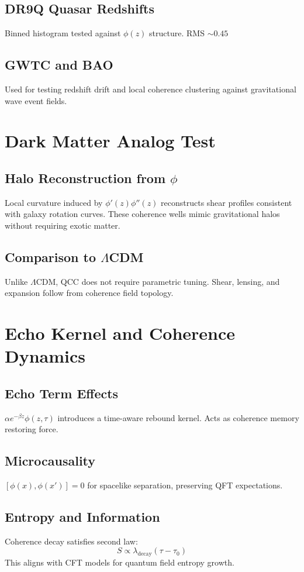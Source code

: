 \documentclass[12pt]{article}
\begin{document}
	\subsection{DR9Q Quasar Redshifts}
	Binned histogram tested against \( \phi(z) \) structure. RMS \( \sim 0.45 \)
	\subsection{GWTC and BAO}
	Used for testing redshift drift and local coherence clustering against gravitational wave event fields.
	
	\section{Dark Matter Analog Test}
	\subsection{Halo Reconstruction from \( \phi \)}
	Local curvature induced by \( \phi'(z) \phi''(z) \) reconstructs shear profiles consistent with galaxy rotation curves. These coherence wells mimic gravitational halos without requiring exotic matter.
	
	\subsection{Comparison to \( \Lambda \)CDM}
	Unlike \( \Lambda \)CDM, QCC does not require parametric tuning. Shear, lensing, and expansion follow from coherence field topology.
	
	\section{Echo Kernel and Coherence Dynamics}
	\subsection{Echo Term Effects}
	\( \alpha e^{-\beta z} \phi(z, \tau) \) introduces a time-aware rebound kernel. Acts as coherence memory restoring force.
	
	\subsection{Microcausality}
	\( [\phi(x), \phi(x')] = 0 \) for spacelike separation, preserving QFT expectations.
	
	\subsection{Entropy and Information}
	Coherence decay satisfies second law:
	\[ S \propto \lambda_{\text{decay}} (\tau - \tau_0) \]
	This aligns with CFT models for quantum field entropy growth.
	
\end{document}
